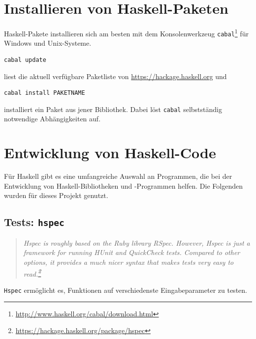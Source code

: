 \section{Installieren von Haskell-Paketen}
Haskell-Pakete installieren sich am besten mit dem Konsolenwerkzeug
\texttt{cabal}\footnote{\url{http://www.haskell.org/cabal/download.html}} für
Windows und Unix-Systeme.
\begin{lstlisting}[language=bash 
                  ,numbers=none
                  ,backgroundcolor=\color{lightgray}]
cabal update
\end{lstlisting}
liest die aktuell verfügbare Paketliste von \url{https://hackage.haskell.org}
und
\begin{lstlisting}[language=bash
                  ,numbers=none
                  ,backgroundcolor=\color{lightgray}]
cabal install PAKETNAME
\end{lstlisting}
installiert ein Paket aus jener Bibliothek.
Dabei löst \texttt{cabal} selbstständig notwendige Abhängigkeiten auf.

\section{Entwicklung von Haskell-Code}
Für Haskell gibt es eine umfangreiche Auswahl an Programmen, die bei der
Entwicklung von Haskell-Bibliotheken und -Programmen helfen. 
Die Folgenden wurden für dieses Projekt genutzt.

\subsection{Tests: \texttt{hspec}}
\begin{quote}\itshape
  Hspec is roughly based on the Ruby library RSpec. However, Hspec is just a
  framework for running HUnit and QuickCheck tests. Compared to other options,
  it provides a much nicer syntax that makes tests very easy to
  read.\footnote{\url{https://hackage.haskell.org/package/hspec}}
\end{quote}
\texttt{Hspec} ermöglicht es, Funktionen auf verschiedenste Eingabeparameter zu
testen.

